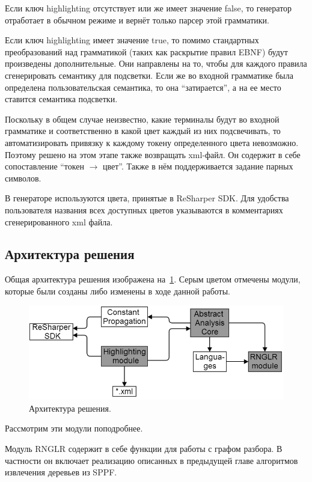 Если ключ highlighting отсутствует или же имеет значение false, то генератор отработает в обычном режиме и вернёт только парсер этой грамматики. 

Если ключ highlighting имеет значение true, то помимо стандартных преобразований над грамматикой (таких как раскрытие правил EBNF) будут произведены дополнительные. Они направлены на то, чтобы для каждого правила сгенерировать семантику для подсветки. Если же во входной грамматике была определена пользовательская семантика, то она ``затирается'', а на ее место ставится семантика подсветки. 

Поскольку в общем случае неизвестно, какие терминалы будут во входной грамматике и соответственно в какой цвет каждый из них подсвечивать, то автоматизировать привязку к каждому токену определенного цвета невозможно. Поэтому решено на этом этапе также возвращать xml-файл. Он содержит в себе сопоставление ``токен $\rightarrow$ цвет''. Также в нём поддерживается задание парных символов.

В генераторе используются цвета, принятые в ReSharper SDK. Для удобства пользователя названия всех доступных цветов указываются в комментариях сгенерированного xml файла. 
\subsection{Архитектура решения}

Общая архитектура решения изображена на~\ref{architecture}. Серым цветом отмечены модули, которые были созданы либо изменены в ходе данной работы.

\begin{figure}[t]
\centering
\includegraphics[width=\linewidth]{Ivanov/Pictures/architecture.png}
\caption{Архитектура решения.}
\label{architecture}
\end{figure}

Рассмотрим эти модули поподробнее. 

Модуль RNGLR содержит в себе функции для работы с графом разбора. В частности он включает реализацию описанных в предыдущей главе алгоритмов извлечения деревьев из SPPF. 

